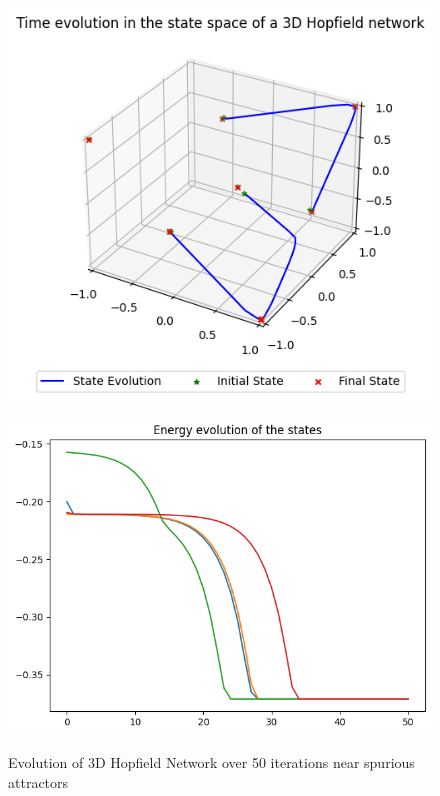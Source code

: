 \begin{figure}[h!]
    \begin{minipage}[t]{0.44\textwidth}
        \includegraphics[width=\textwidth]{figures/hopfield-3d-iterations-50-state-space-perturbations.png}
        \label{fig:hopfield-3d-iterations-50-state-space-perturbations}
    \end{minipage}
    \begin{minipage}[t]{0.54\textwidth}
        \includegraphics[width=\textwidth]{figures/hopfield-3d-iterations-50-energy-evolution-perturbations.png}
        \label{fig:hopfield-3d-iterations-50-energy-evolution-perturbations}
    \end{minipage}
    \caption{Evolution of 3D Hopfield Network over 50 iterations near spurious attractors}
\end{figure}


